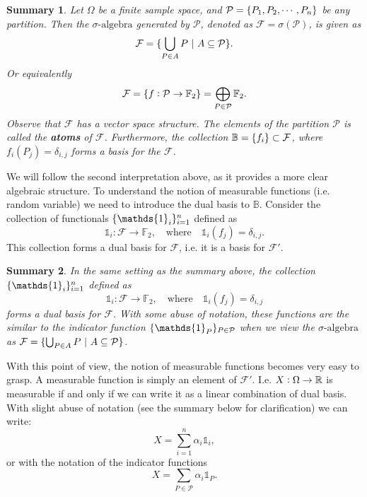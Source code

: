 \documentclass[11pt,a4paper]{article}
\newtheorem{summary}{Summary}
\theoremstyle{definition}
\theoremstyle{remark}
\begin{document}
	\begin{summary}
		\label{sum:DefinitionOfSigAlg}
		Let $ \Omega $ be a finite sample space, and $ \mathcal{P} = \{P_1,P_2,\cdots,P_n\} $ be any partition. Then the $\sigma\text{-algebra}$ generated by $ \mathcal{P} $, denoted as $ \mathcal{F} = \sigma(\mathcal{P}) $, is given as
		\[ \mathcal{F} = \{\bigcup_{P\in A} P\ |\ A\subseteq \mathcal{P} \}. \]
		Or equivalently
		\[ \mathcal{F} = \{f: \mathcal{P} \to \mathbb{F}_2\} = \bigoplus_{P\in \mathcal{P}} \mathbb{F}_2. \]
		Observe that $ \mathcal{F} $ has a vector space structure. The elements of the partition $ \mathcal{P} $ is called the \textbf{atoms} of $ \mathcal{F} $. Furthermore, the collection $ \mathbb{B} = \{f_i\} \subset \mathcal{F} $, where $ f_i(P_j) = \delta_{i,j} $ forms a basis for the $ \mathcal{F} $.
	\end{summary}
	
	We will follow the second interpretation above, as it provides a more clear algebraic structure. To understand the notion of measurable functions (i.e. random variable) we need to introduce the dual basis to $ \mathbb{B} $. Consider the collection of functionals $ \set{\mathds{1}_i}_{i=1}^n $ defined as
	\[ \mathds{1}_{i}: \mathcal{F} \to \mathbb{F}_2, \quad \text{where} \quad \mathds{1}_{i}(f_j) = \delta_{i,j}. \]
	This collection forms a dual basis for $ \mathcal{F} $, i.e. it is a basis for $ \mathcal{F}' $.
	
	\begin{summary}
		\label{sum:DualBasis}
		In the same setting as the summary above, the collection  $ \set{\mathds{1}_i}_{i=1}^n $ defined as
		\[ \mathds{1}_{i}: \mathcal{F} \to \mathbb{F}_2, \quad \text{where} \quad \mathds{1}_{i}(f_j) = \delta_{i,j} \]
		forms a dual basis for $ \mathcal{F} $. With some abuse of notation, these functions are the similar to the indicator function $ \set{\mathds{1}_{P}}_{P\in \mathcal{P}} $ when we view the $\sigma\text{-algebra}$ as $ \mathcal{F} = \set{\bigcup_{P\in A} P\ |\ A\subseteq \mathcal{P} } $.
	\end{summary}
	
	With this point of view, the notion of measurable functions becomes very easy to grasp. A measurable function is simply an element of $ \mathcal{F}' $. I.e. $ X:\Omega \to \mathbb{R} $ is measurable if and only if we can write it as a linear combination of dual basis. With slight abuse of notation (see the summary below for clarification) we can write:
	\[ X = \sum_{i=1}^{n} \alpha_i \mathds{1}_{i}, \]
	or with the notation of the indicator functions
	\[ X = \sum_{P\in \mathcal{P}} \alpha_i \mathds{1}_{P}. \] 
	
\end{document}
